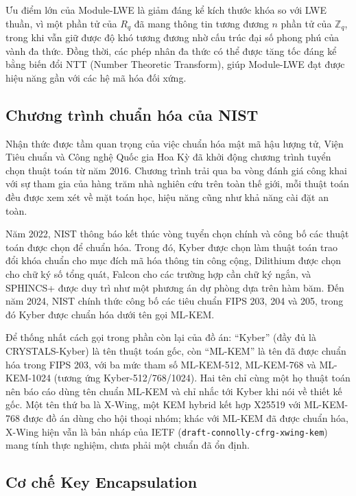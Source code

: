 Ưu điểm lớn của Module-LWE là giảm đáng kể kích thước khóa so với LWE thuần, vì một phần tử của $R_q$ đã mang thông tin tương đương $n$ phần tử của $\mathbb{Z}_q$, trong khi vẫn giữ được độ khó tương đương nhờ cấu trúc đại số phong phú của vành đa thức. Đồng thời, các phép nhân đa thức có thể được tăng tốc đáng kể bằng biến đổi NTT (Number Theoretic Transform), giúp Module-LWE đạt được hiệu năng gần với các hệ mã hóa đối xứng.

\subsection{Chương trình chuẩn hóa của NIST}

Nhận thức được tầm quan trọng của việc chuẩn hóa mật mã hậu lượng tử, Viện Tiêu chuẩn và Công nghệ Quốc gia Hoa Kỳ đã khởi động chương trình tuyển chọn thuật toán từ năm 2016. Chương trình trải qua ba vòng đánh giá công khai với sự tham gia của hàng trăm nhà nghiên cứu trên toàn thế giới, mỗi thuật toán đều được xem xét về mặt toán học, hiệu năng cũng như khả năng cài đặt an toàn.

Năm 2022, NIST thông báo kết thúc vòng tuyển chọn chính và công bố các thuật toán được chọn để chuẩn hóa. Trong đó, Kyber được chọn làm thuật toán trao đổi khóa chuẩn cho mục đích mã hóa thông tin công cộng, Dilithium được chọn cho chữ ký số tổng quát, Falcon cho các trường hợp cần chữ ký ngắn, và SPHINCS+ được duy trì như một phương án dự phòng dựa trên hàm băm. Đến năm 2024, NIST chính thức công bố các tiêu chuẩn FIPS 203, 204 và 205, trong đó Kyber được chuẩn hóa dưới tên gọi ML-KEM.

Để thống nhất cách gọi trong phần còn lại của đồ án: ``Kyber'' (đầy đủ là CRYSTALS-Kyber) là tên thuật toán gốc, còn ``ML-KEM'' là tên đã được chuẩn hóa trong FIPS 203, với ba mức tham số ML-KEM-512, ML-KEM-768 và ML-KEM-1024 (tương ứng Kyber-512/768/1024). Hai tên chỉ cùng một họ thuật toán nên báo cáo dùng tên chuẩn ML-KEM và chỉ nhắc tới Kyber khi nói về thiết kế gốc. Một tên thứ ba là X-Wing, một KEM hybrid kết hợp X25519 với ML-KEM-768 được đồ án dùng cho hội thoại nhóm; khác với ML-KEM đã được chuẩn hóa, X-Wing hiện vẫn là bản nháp của IETF (\texttt{draft-connolly-cfrg-xwing-kem}) mang tính thực nghiệm, chưa phải một chuẩn đã ổn định.

\subsection{Cơ chế Key Encapsulation}

